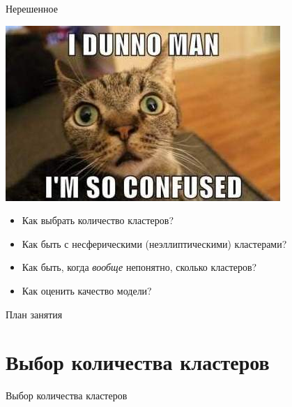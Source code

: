 \documentclass[10pt]{beamer}
\begin{document}
\begin{frame}{Нерешенное}

\begin{center}
\includegraphics[scale=0.5]{images/confusion.jpg}
\end{center}

\begin{itemize}
\item Как выбрать количество кластеров?
\item Как быть с несферическими (неэллиптическими) кластерами?
\item Как быть, когда {\it вообще} непонятно, сколько кластеров?
\item Как оценить качество модели?
\end{itemize}

\end{frame}

\begin{frame}{План занятия}
\tableofcontents
\end{frame}


\section{Выбор количества кластеров}


\begin{frame}

\begin{center}
{\Large Выбор количества кластеров}
\end{center}

\end{frame}
\end{document}
